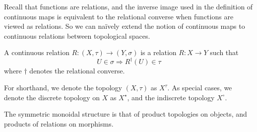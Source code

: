 

Recall that functions are relations, and the inverse image used in the definition of continuous maps is equivalent to the relational converse when functions are viewed as relations. So we can na\"{i}vely extend the notion of continuous maps to continuous relations between topological spaces.

\begin{defn}\label{defn:Contrelation}
A continuous relation $R: (X,\tau) \rightarrow (Y,\sigma)$ is a relation $R: X \rightarrow Y$ such that \[U \in \sigma \Rightarrow R^{\dag}(U) \in \tau\] where $\dag$ denotes the relational converse.
\end{defn}

\begin{notation}
For shorthand, we denote the topology $(X,\tau)$ as $X^{\tau}$. As special cases, we denote the discrete topology on $X$ as $X^{\star}$, and the indiscrete topology $X^{\circ}$.
\end{notation}

The symmetric monoidal structure is that of product topologies on objects, and products of relations on morphisms.




